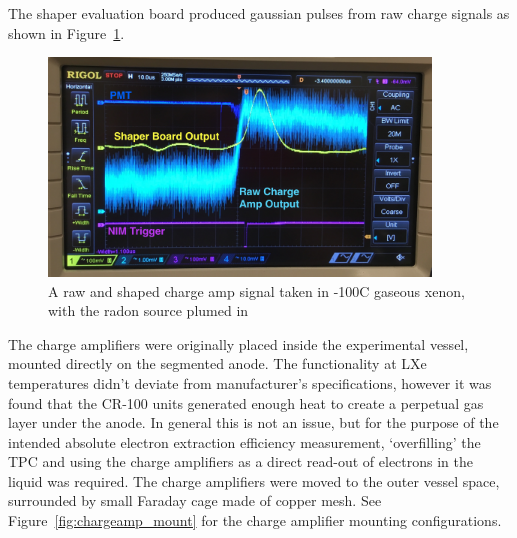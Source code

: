 The shaper evaluation board produced gaussian pulses from raw charge signals as shown in Figure~\ref{fig:shaper}.

\begin{figure}[htbp]
\begin{center}
\includegraphics[width=4in]{figures/testbed/charge_amp_shaper.jpg}
\caption{A raw and shaped charge amp signal taken in -100C gaseous xenon, with the radon source plumed in}
\label{fig:shaper}
\end{center}
\end{figure}

The charge amplifiers were originally placed inside the experimental vessel, mounted directly on the segmented anode. The functionality at \ac{LXe} temperatures didn't deviate from manufacturer's specifications, however it was found that the CR-100 units generated enough heat to create a perpetual gas layer under the anode. In general this is not an issue, but for the purpose of the intended absolute electron extraction efficiency measurement, `overfilling' the TPC and using the charge amplifiers as a direct read-out of electrons in the liquid was required. The charge amplifiers were moved to the outer vessel space, surrounded by small Faraday cage made of copper mesh. See Figure~\ref{fig:chargeamp_mount} for the charge amplifier mounting configurations.

